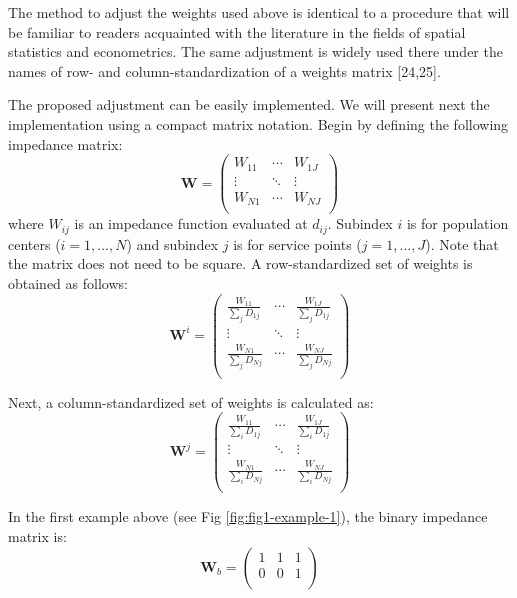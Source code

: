 \documentclass[10pt,letterpaper]{article}
\begin{document}
The method to adjust the weights used above is identical to a procedure
that will be familiar to readers acquainted with the literature in the
fields of spatial statistics and econometrics. The same adjustment is
widely used there under the names of row- and column-standardization of
a weights matrix {[}24,25{]}.

The proposed adjustment can be easily implemented. We will present next
the implementation using a compact matrix notation. Begin by defining
the following impedance matrix: \[
\mathbf{W} = \left(\begin{array}{ccc}
            W_{11} & \cdots & W_{1J}\\
            \vdots & \ddots & \vdots\\
            W_{N1} & \cdots & W_{NJ}\\
        \end{array}
        \right)
\] where \(W_{ij}\) is an impedance function evaluated at \(d_{ij}\).
Subindex \(i\) is for population centers (\(i=1,\dots,N\)) and subindex
\(j\) is for service points (\(j=1,\dots,J\)). Note that the matrix does
not need to be square. A row-standardized set of weights is obtained as
follows: \[
\mathbf{W}^{i} = \left(\begin{array}{ccc}
            \frac{W_{11}}{\sum_jD_{1j}} & \cdots & \frac{W_{1J}}{\sum_jD_{1j}}\\
            \vdots & \ddots & \vdots\\
            \frac{W_{N1}}{\sum_jD_{Nj}} & \cdots & \frac{W_{NJ}}{\sum_jD_{Nj}}\\
        \end{array}
        \right)
\]

Next, a column-standardized set of weights is calculated as: \[
\mathbf{W}^{j} = \left(\begin{array}{ccc}
            \frac{W_{11}}{\sum_iD_{1j}} & \cdots & \frac{W_{1J}}{\sum_iD_{1j}}\\
            \vdots & \ddots & \vdots\\
            \frac{W_{N1}}{\sum_iD_{Nj}} & \cdots & \frac{W_{NJ}}{\sum_iD_{Nj}}\\
        \end{array}
        \right)
\]

In the first example above (see Fig \ref{fig:fig1-example-1}), the
binary impedance matrix is: \[
\mathbf{W}_b = \left(\begin{array}{ccc}
            1 & 1 & 1\\
            0 & 0 & 1\\
        \end{array}
        \right)
\]
\end{document}
